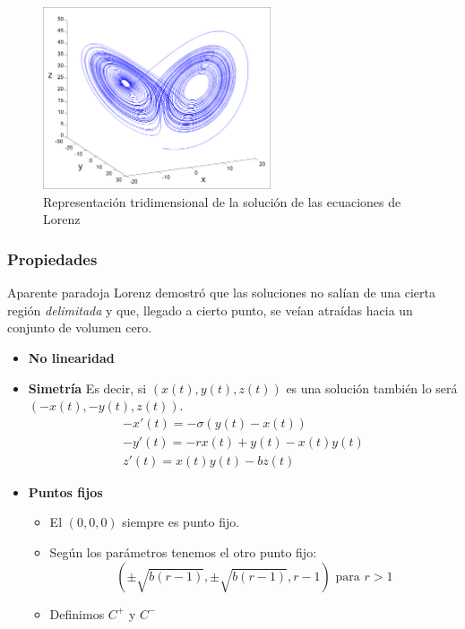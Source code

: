 \documentclass[8pt]{beamer}
\begin{document}
\begin{frame}
\begin{figure}[hbtp]
\centering
\includegraphics[width = 0.6\textwidth]{img/Lorenz.png}
\caption{Representación tridimensional de la solución de las ecuaciones de Lorenz}
\label{fig:Lorenz}
\end{figure}
\end{frame}

\subsubsection{Propiedades}
\begin{frame}
\begin{block}{Aparente paradoja}
Lorenz demostró que las soluciones no salían de una cierta región \emph{delimitada} y que, llegado a cierto punto, se veían atraídas hacia un conjunto de volumen cero.
\end{block}

\begin{itemize}
\item \textbf{No linearidad}
\item \textbf{Simetría}
Es decir, si $(x(t),y(t),z(t))$ es una solución también lo será $(-x(t),-y(t),z(t))$.
\[\begin{array}{l}
-x'(t) = -σ(y(t)-x(t)) \\
-y'(t) = -rx(t)+y(t)-x(t)y(t)\\
z'(t) = x(t)y(t)-bz(t)
\end{array}\]
\item \textbf{Puntos fijos}
\begin{itemize}
\item El $(0,0,0)$ siempre es punto fijo.
\item Según los parámetros tenemos el otro punto fijo:
\[(\pm \sqrt{b(r-1)},\pm \sqrt{b(r-1)},r-1) \text{ para } r>1\]
\item Definimos $C^+$ y $C^-$
\end{itemize}
\end{itemize}
\end{frame}
\end{document}
